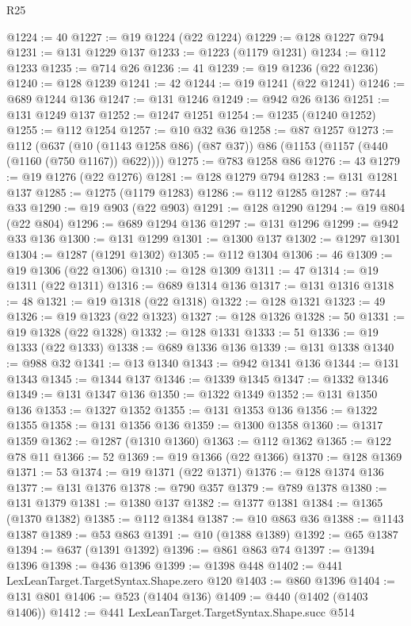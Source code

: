 \begin{lexlean}{R25}
\begin{coremodule}
{{{{{{{{{{{{{{{{{{{{{{{{{{{{{{{{{{{{{{{{{{{{{{{{{{{{{{{{{{{{{{{{{{{{{{{{{{{{{{{{{{{{{{{{{{{{{{{{{{{{{{{{{{{{{{{{{{{{{{{{{{{{{{{{{{{{{{{{{{{{{{{{{{{{{{{{{{{{{{{{{{{{{{{{{{{{{{{{{{{{{{{{{{{{{{{{{{{{{{{@1224 := 40
@1227 := @19 @1224 (@22 @1224)
@1229 := @128 @1227 @794
@1231 := @131 @1229 @137
@1233 := @1223 (@1179 @1231)
@1234 := @112 @1233
@1235 := @714 @26
@1236 := 41
@1239 := @19 @1236 (@22 @1236)
@1240 := @128 @1239
@1241 := 42
@1244 := @19 @1241 (@22 @1241)
@1246 := @689 @1244 @136
@1247 := @131 @1246
@1249 := @942 @26 @136
@1251 := @131 @1249 @137
@1252 := @1247 @1251
@1254 := @1235 (@1240 @1252)
@1255 := @112 @1254
@1257 := @10 @32 @36
@1258 := @87 @1257
@1273 := @112
    (@637 (@10 (@1143 @1258 @86) (@87 @37)) @86 (@1153 (@1157 (@440 (@1160 (@750 @1167)) @622))))
@1275 := @783 @1258 @86
@1276 := 43
@1279 := @19 @1276 (@22 @1276)
@1281 := @128 @1279 @794
@1283 := @131 @1281 @137
@1285 := @1275 (@1179 @1283)
@1286 := @112 @1285
@1287 := @744 @33
@1290 := @19 @903 (@22 @903)
@1291 := @128 @1290
@1294 := @19 @804 (@22 @804)
@1296 := @689 @1294 @136
@1297 := @131 @1296
@1299 := @942 @33 @136
@1300 := @131 @1299
@1301 := @1300 @137
@1302 := @1297 @1301
@1304 := @1287 (@1291 @1302)
@1305 := @112 @1304
@1306 := 46
@1309 := @19 @1306 (@22 @1306)
@1310 := @128 @1309
@1311 := 47
@1314 := @19 @1311 (@22 @1311)
@1316 := @689 @1314 @136
@1317 := @131 @1316
@1318 := 48
@1321 := @19 @1318 (@22 @1318)
@1322 := @128 @1321
@1323 := 49
@1326 := @19 @1323 (@22 @1323)
@1327 := @128 @1326
@1328 := 50
@1331 := @19 @1328 (@22 @1328)
@1332 := @128 @1331
@1333 := 51
@1336 := @19 @1333 (@22 @1333)
@1338 := @689 @1336 @136
@1339 := @131 @1338
@1340 := @988 @32
@1341 := @13 @1340
@1343 := @942 @1341 @136
@1344 := @131 @1343
@1345 := @1344 @137
@1346 := @1339 @1345
@1347 := @1332 @1346
@1349 := @131 @1347 @136
@1350 := @1322 @1349
@1352 := @131 @1350 @136
@1353 := @1327 @1352
@1355 := @131 @1353 @136
@1356 := @1322 @1355
@1358 := @131 @1356 @136
@1359 := @1300 @1358
@1360 := @1317 @1359
@1362 := @1287 (@1310 @1360)
@1363 := @112 @1362
@1365 := @122 @78 @11
@1366 := 52
@1369 := @19 @1366 (@22 @1366)
@1370 := @128 @1369
@1371 := 53
@1374 := @19 @1371 (@22 @1371)
@1376 := @128 @1374 @136
@1377 := @131 @1376
@1378 := @790 @357
@1379 := @789 @1378
@1380 := @131 @1379
@1381 := @1380 @137
@1382 := @1377 @1381
@1384 := @1365 (@1370 @1382)
@1385 := @112 @1384
@1387 := @10 @863 @36
@1388 := @1143 @1387
@1389 := @53 @863
@1391 := @10 (@1388 @1389)
@1392 := @65 @1387
@1394 := @637 (@1391 @1392)
@1396 := @861 @863 @74
@1397 := @1394 @1396
@1398 := @436 @1396
@1399 := @1398 @448
@1402 := @441 LexLeanTarget.TargetSyntax.Shape.zero @120
@1403 := @860 @1396
@1404 := @131 @801
@1406 := @523 (@1404 @136)
@1409 := @440 (@1402 (@1403 @1406))
@1412 := @441 LexLeanTarget.TargetSyntax.Shape.succ @514
}}}}}}}}}}}}}}}}}}}}}}}}}}}}}}}}}}}}}}}}}}}}}}}}}}}}}}}}}}}}}}}}}}}}}}}}}}}}}}}}}}}}}}}}}}}}}}}}}}}}}}}}}}}}}}}}}}}}}}}}}}}}}}}}}}}}}}}}}}}}}}}}}}}}}}}}}}}}}}}}}}}}}}}}}}}}}}}}}}}}}}}}}}}}}}}}}}}}}}}
\end{coremodule}
\end{lexlean}

